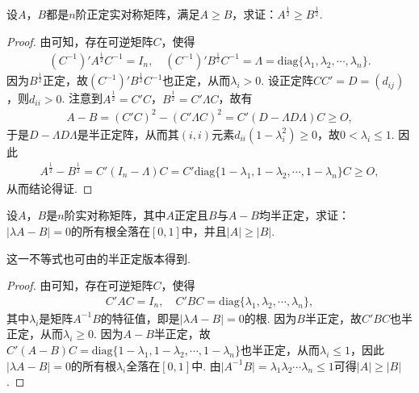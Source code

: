 \documentclass[../../main.tex]{subfiles}%
\begin{document}
\begin{example}\label{example:例9.79}
设\(A\)，\(B\)都是\(n\)阶正定实对称矩阵，满足\(A\geqslant  B\)，求证：\(A^{\frac{1}{2}}\geqslant  B^{\frac{1}{2}}\).
\end{example}
\begin{proof}

由可知，存在可逆矩阵\(C\)，使得
\begin{align*}
(C^{-1})'A^{\frac{1}{2}}C^{-1} = I_n,\quad (C^{-1})'B^{\frac{1}{2}}C^{-1} = \Lambda = \mathrm{diag}\{\lambda_1,\lambda_2,\cdots,\lambda_n\}.
\end{align*}
因为\(B^{\frac{1}{2}}\)正定，故\((C^{-1})'B^{\frac{1}{2}}C^{-1}\)也正定，从而\(\lambda_i>0\). 设正定阵\(CC' = D=(d_{ij})\)，则\(d_{ii}>0\). 注意到\(A^{\frac{1}{2}} = C'C\)，\(B^{\frac{1}{2}} = C'\Lambda C\)，故有
\begin{align*}
A - B=(C'C)^2-(C'\Lambda C)^2 = C'(D - \Lambda D\Lambda)C\geqslant  O,
\end{align*}
于是\(D - \Lambda D\Lambda\)是半正定阵，从而其\((i,i)\)元素\(d_{ii}(1 - \lambda_i^2)\geqslant 0\)，故\(0<\lambda_i\leqslant 1\). 因此
\begin{align*}
A^{\frac{1}{2}} - B^{\frac{1}{2}} = C'(I_n - \Lambda)C = C'\mathrm{diag}\{1 - \lambda_1,1 - \lambda_2,\cdots,1 - \lambda_n\}C\geqslant  O,
\end{align*}
从而结论得证.

\end{proof}

\begin{example}\label{example:例9.80}
设\(A\)，\(B\)是\(n\)阶实对称矩阵，其中\(A\)正定且\(B\)与\(A - B\)均半正定，求证：\(\vert\lambda A - B\vert = 0\)的所有根全落在\([0,1]\)中，并且\(\vert A\vert\geqslant \vert B\vert\).
\end{example}
\begin{remark}
这一不等式也可由的半正定版本得到.
\end{remark}
\begin{proof}

由可知，存在可逆矩阵\(C\)，使得
\begin{align*}
C'AC = I_n,\quad C'BC = \mathrm{diag}\{\lambda_1,\lambda_2,\cdots,\lambda_n\},
\end{align*}
其中\(\lambda_i\)是矩阵\(A^{-1}B\)的特征值，即是\(\vert\lambda A - B\vert = 0\)的根. 因为\(B\)半正定，故\(C'BC\)也半正定，从而\(\lambda_i\geqslant 0\). 因为\(A - B\)半正定，故\(C'(A - B)C = \mathrm{diag}\{1 - \lambda_1,1 - \lambda_2,\cdots,1 - \lambda_n\}\)也半正定，从而\(\lambda_i\leqslant 1\)，因此\(\vert\lambda A - B\vert = 0\)的所有根\(\lambda_i\)全落在\([0,1]\)中. 由\(\vert A^{-1}B\vert=\lambda_1\lambda_2\cdots\lambda_n\leqslant 1\)可得\(\vert A\vert\geqslant \vert B\vert\). 

\end{proof}
\end{document}
